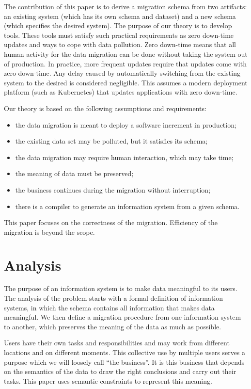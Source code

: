 \documentclass{elsarticle}
\begin{document}
   The contribution of this paper is to derive a migration schema from two artifacts: an existing system
   (which has its own schema and dataset) and a new schema (which specifies the desired system).
   The purpose of our theory is to develop tools.
   These tools must satisfy such practical requirements as
   zero down-time updates and ways to cope with data pollution.
   Zero down-time means that all human activity for the data migration can be done without taking the system out of production.
   In practice, more frequent updates require that updates come with zero down-time.
   Any delay caused by automatically switching from the existing system to the desired is considered negligible.
   This assumes a modern deployment platform (such as Kubernetes) that updates applications with zero down-time.
   
   Our theory is based on the following assumptions and requirements:
\begin{itemize}
   \item the data migration is meant to deploy a software increment in production;
   \item the existing data set may be polluted, but it satisfies its schema;
   \item the data migration may require human interaction, which may take time;
   \item the meaning of data must be preserved;
   \item the business continues during the migration without interruption;
   \item there is a compiler to generate an information system from a given schema.
\end{itemize}
   This paper focuses on the correctness of the migration.
   Efficiency of the migration is beyond the scope.

\section{Analysis}
\label{sct:Analysis}
   The purpose of an information system is to make data meaningful to its users.
   The analysis of the problem starts with a formal definition of information systems,
   in which the schema contains all information that makes data meaningful.
   We then define a migration procedure from one information system to another,
   which preserves the meaning of the data as much as possible.

   Users have their own tasks and responsibilities
   and may work from different locations and on different moments.
   This collective use by multiple users serves a purpose which we will loosely call ``the business''.
   It is this business that depends on the semantics of the data to draw the right conclusions and carry out their tasks.
   This paper uses semantic constraints to represent this meaning.
   
\end{document}
